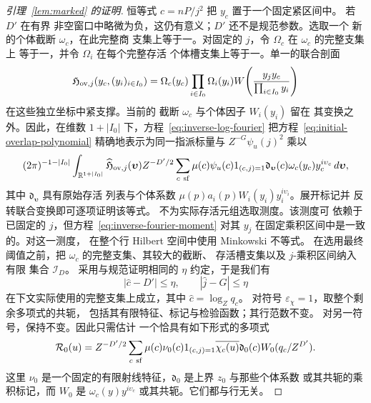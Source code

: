 \begin{proof}[引理~\ref{lem:marked} 的证明]
恒等式 \(c=nP/j^2\) 把 \(y_c\) 置于一个固定紧区间中。
若 \(D'\) 在有界
非空窗口中略微为负，这仍有意义；\(D'\) 还不是规范参数。选取一个
新的个体截断 \(\omega_c\)，在此完整商
支集上等于一。对固定的 \(j\)，令 \(\Omega_c\) 在 \(\omega_c\) 的完整支集上
等于一，并令 \(\Omega_i\) 在每个完整存活
个体槽支集上等于一。单一的联合剖面
\[
 \mathfrak H_{{\rm ov},j}(y_c,(y_i)_{i\in I_0})
 =\Omega_c(y_c)\prod_{i\in I_0}\Omega_i(y_i)
 W\!\left(\frac{y_jy_c}{\prod_{i\in I_0}y_i}\right)
\]
在这些独立坐标中紧支撑。当前的
截断 \(\omega_c\) 与个体因子 \(W_i(y_i)\) 留在
其变换之外。因此，在维数
\(1+|I_0|\) 下，方程~\eqref{eq:inverse-log-fourier} 把方程~\eqref{eq:initial-overlap-polynomial}
精确地表示为同一指派标量与 \(Z^{-G}\psi_u(j)^2\) 乘以
\[
 (2\pi)^{-1-|I_0|}\int_{\mathbb R^{1+|I_0|}}
 \widehat{\mathfrak H}_{{\rm ov},j}(\boldsymbol\upsilon)
 Z^{-D'/2}\sum_{c\ {\rm sf}}\mu(c)\psi_u(c)1_{(c,j)=1}
 \mathfrak d_{\boldsymbol\upsilon}(c)
 \omega_c(y_c)y_c^{i\upsilon_c}\,d\boldsymbol\upsilon,
\]
其中 \(\mathfrak d_{\boldsymbol\upsilon}\) 具有原始存活
列表与个体系数
\(\mu(p)a_i(p)W_i(y_i)y_i^{i\upsilon_i}\)。展开标记并
反转联合变换即可逐项证明该等式。
不为实际存活元组选取测度。该测度可
依赖于已固定的 \(j\)，但方程~\eqref{eq:inverse-fourier-moment}
对其 \(y_j\) 在固定乘积区间中是一致的。对这一测度，
在整个行 Hilbert 空间中使用 Minkowski
不等式。
在选用最终阈值之前，把 \(\omega_c\) 的完整支集、其较大的截断、
存活槽支集以及 \(j\)-乘积区间纳入有限
集合 \(\mathcal I_D\)。
采用与规范证明相同的 \(\eta\) 约定，于是我们有
\[
 |\widehat c-D'|\le\eta,\qquad |\widehat j-G|\le\eta
\]
在下文实际使用的完整支集上成立，其中 \(\widehat c=\log_Zq_c\)。
对符号
\(\varepsilon_\chi=1\)，取整个剩余多项式的共轭，
包括其有限特征、标记与检验函数；其行范数不变。
对另一符号，保持不变。因此只需估计
一个恰具有如下形式的多项式
\begin{equation}\label{eq:initial-residual-polynomial}
 \mathcal R_0(u)=Z^{-D'/2}\sum_{c\ {\rm sf}}
 \mu(c)\nu_0(c)1_{(c,j)=1}\overline{\chi_c(u)}
 \mathfrak d_0(c)W_0(q_c/Z^{D'}).
\end{equation}
这里 \(\nu_0\) 是一个固定的有限射线特征，\(\mathfrak d_0\)
是上界 \(z_0\) 与那些个体系数
或其共轭的乘积标记，而 \(W_0\) 是 \(\omega_c(y)y^{i\upsilon_c}\)
或其共轭。它们都与行无关。


\end{proof}

